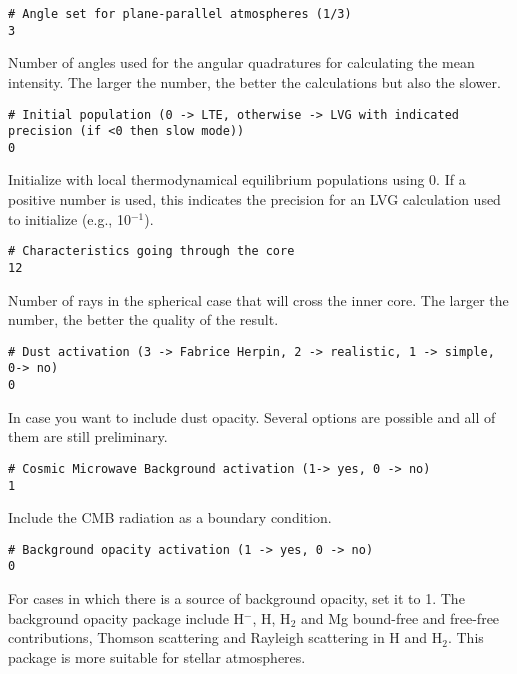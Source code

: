 \documentclass[12pt]{article}
\begin{document}
\begin{footnotesize} \begin{verbatim}
# Angle set for plane-parallel atmospheres (1/3)
3
\end{verbatim} \end{footnotesize}
Number of angles used for the angular quadratures for
calculating the mean intensity. The larger the number,
the better the calculations but also the slower.

\begin{footnotesize} \begin{verbatim}
# Initial population (0 -> LTE, otherwise -> LVG with indicated precision (if <0 then slow mode))
0
\end{verbatim} \end{footnotesize}
Initialize with local thermodynamical equilibrium populations using 0. If a positive
number is used, this indicates the precision for an LVG calculation used to
initialize (e.g., 10$^{-1}$).

\begin{footnotesize} \begin{verbatim}
# Characteristics going through the core
12
\end{verbatim} \end{footnotesize}
Number of rays in the spherical case that will cross the
inner core. The larger the number, the better the quality
of the result.

\begin{footnotesize} \begin{verbatim}
# Dust activation (3 -> Fabrice Herpin, 2 -> realistic, 1 -> simple, 0-> no)
0
\end{verbatim} \end{footnotesize}
In case you want to include dust opacity. Several options are possible and
all of them are still preliminary.

\begin{footnotesize} \begin{verbatim}
# Cosmic Microwave Background activation (1-> yes, 0 -> no)
1
\end{verbatim} \end{footnotesize}
Include the CMB radiation as a boundary condition.

\begin{footnotesize} \begin{verbatim}
# Background opacity activation (1 -> yes, 0 -> no)
0
\end{verbatim} \end{footnotesize}
For cases in which there is a source of background opacity, set it to 1.
The background opacity package include H$^-$, H, H$_2$ and Mg bound-free and free-free
contributions, Thomson scattering and Rayleigh scattering in H and H$_2$. This
package is more suitable for stellar atmospheres.
\end{document}
